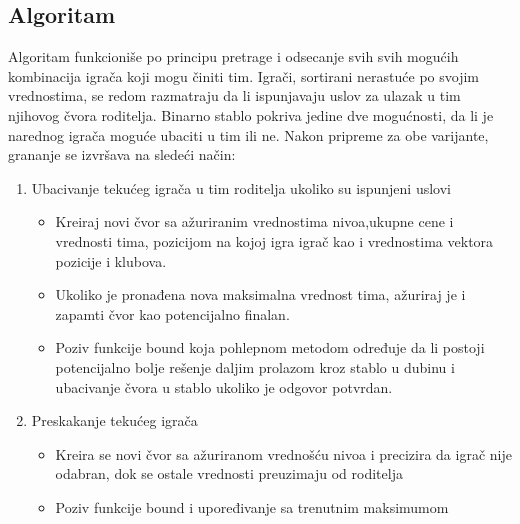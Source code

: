 \documentclass[a4paper]{article}
\begin{document}
\subsection{Algoritam}
\vspace{3mm} 

Algoritam funkcioniše po principu pretrage i odsecanje svih svih mogućih kombinacija igrača koji mogu činiti tim. Igrači, sortirani nerastuće po svojim vrednostima, se redom razmatraju da li ispunjavaju uslov za ulazak u tim njihovog čvora roditelja. Binarno stablo pokriva jedine dve mogućnosti, da li je narednog igrača moguće ubaciti u tim ili ne. Nakon pripreme za obe varijante, grananje se izvršava na sledeći način: 

\begin{enumerate}
  \item Ubacivanje tekućeg igrača u tim roditelja ukoliko su ispunjeni uslovi 
  \vspace{1mm}
  \begin{itemize}
	\item Kreiraj novi čvor sa ažuriranim vrednostima nivoa,ukupne cene i vrednosti tima, pozicijom na kojoj igra igrač kao i vrednostima vektora pozicije i klubova.  
	\vspace{1mm}
	\item Ukoliko je pronađena nova maksimalna vrednost tima, ažuriraj je i zapamti čvor kao potencijalno finalan.
	\vspace{1mm}
	\item Poziv funkcije bound koja pohlepnom metodom određuje da li postoji potencijalno bolje rešenje daljim prolazom kroz stablo u dubinu i ubacivanje čvora u stablo ukoliko je odgovor potvrdan.
	
  \end{itemize}
  \vspace{1mm}
  \item Preskakanje tekućeg igrača 
  \vspace{1mm}
  \begin{itemize}
	\item Kreira se novi čvor sa ažuriranom vrednošću nivoa i precizira da igrač nije odabran, dok se ostale vrednosti preuzimaju od roditelja
	\vspace{1mm}
	\item Poziv funkcije bound i upoređivanje sa trenutnim maksimumom
	
  \end{itemize}
\end{enumerate} 
\vspace{3mm} 
\end{document}
